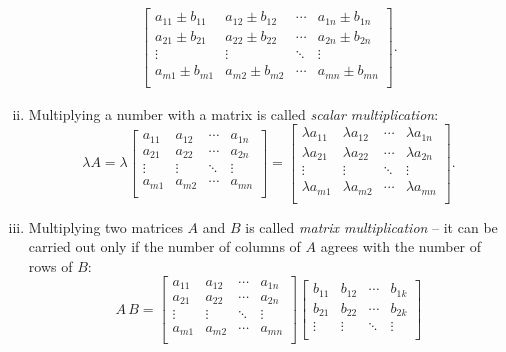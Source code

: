 \begin{definition}[Matrices]
\begin{enumerate}[(i)]
\begin{equation*}
\begin{split}
\begin{bmatrix}
		a_{11} \pm b_{11} & a_{12} \pm b_{12} & \cdots & a_{1n} \pm b_{1n} \\
		a_{21} \pm b_{21} & a_{22} \pm b_{22} & \cdots & a_{2n} \pm b_{2n} \\
		\vdots & \vdots & \ddots & \vdots \\
		a_{m1} \pm b_{m1} & a_{m2} \pm b_{m2} & \cdots & a_{mn} \pm b_{mn} \\
		\end{bmatrix}.
		\end{split}\end{equation*}
	\item Multiplying a number with a matrix is called \emph{scalar multiplication}:
		\[ \lambda A = \lambda \begin{bmatrix}
		a_{11} & a_{12} & \cdots & a_{1n} \\
		a_{21} & a_{22} & \cdots & a_{2n} \\
		\vdots & \vdots & \ddots & \vdots \\
		a_{m1} & a_{m2} & \cdots & a_{mn} \\
		\end{bmatrix} = \begin{bmatrix}
		\lambda a_{11} & \lambda a_{12} & \cdots & \lambda a_{1n} \\
		\lambda a_{21} & \lambda a_{22} & \cdots & \lambda a_{2n} \\
		\vdots & \vdots & \ddots & \vdots \\
		\lambda a_{m1} & \lambda a_{m2} & \cdots & \lambda a_{mn} \\
		\end{bmatrix}.\]
	\item Multiplying two matrices $A$ and $B$ is called \emph{matrix multiplication} -- it can be carried out only if the number of columns of $A$ agrees with the number of rows of $B$:
		\begin{equation*}
		A \, B =\begin{bmatrix}
		a_{11} & a_{12} & \cdots & a_{1n} \\
		a_{21} & a_{22} & \cdots & a_{2n} \\
		\vdots & \vdots & \ddots & \vdots \\
		a_{m1} & a_{m2} & \cdots & a_{mn} \\
		\end{bmatrix} \begin{bmatrix}
		b_{11} & b_{12} & \cdots & b_{1k} \\
		b_{21} & b_{22} & \cdots & b_{2k} \\
		\vdots & \vdots & \ddots & \vdots \\

\end{bmatrix}
\end{equation*}
\end{enumerate}
\end{definition}
